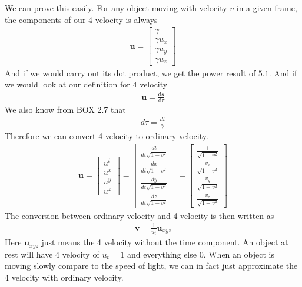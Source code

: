 \documentclass[11pt,letterpaper]{book}
\newcommand{\dydx}[2]{\frac{\text{d} #1}{\text{d} #2}}
\begin{document}
We can prove this easily. For any object moving with velocity $v$ in a given frame, the components of our 4 velocity is always
\begin{align}
\mathbf{u}=\begin{bmatrix}
    \gamma\\ \gamma u_x \\ \gamma u_y \\\gamma u_z 
\end{bmatrix}
\end{align}
And if we would carry out its dot product, we get the power result of $5.1$. And if we would look at our definition for 4 velocity
\begin{align}
\mathbf{u} = \dydx{\mathbf{s}}{\tau}
\end{align}
We also know from BOX 2.7 that
\begin{align}
d\tau = \frac{dt}{\gamma}
\end{align}
Therefore we can convert 4 velocity to ordinary velocity.
\begin{align}
\mathbf{u}= 
\begin{bmatrix}
u^t \\
u^x \\
u^y \\
u^z
\end{bmatrix}
=
\begin{bmatrix}
\frac{dt}{dt\sqrt{1 - v^2}} \\
\frac{dx}{dt\sqrt{1 - v^2}} \\
\frac{dy}{dt\sqrt{1 - v^2}} \\
\frac{dz}{dt\sqrt{1 - v^2}}
\end{bmatrix}
=
\begin{bmatrix}
\frac{1}{\sqrt{1 - v^2}} \\
\frac{v_x}{\sqrt{1 - v^2}} \\
\frac{v_y}{\sqrt{1 - v^2}} \\
\frac{v_z}{\sqrt{1 - v^2}}
\end{bmatrix}
\end{align}
The conversion between ordinary velocity and 4 velocity is then written as
\begin{align}
\mathbf{v} = \frac{1}{u_t}\mathbf{u}_{xyz}
\end{align}
Here $\mathbf{u}_{xyz}$ just means the 4 velocity without the time component. An object at rest will have 4 velocity of $u_t = 1$ and everything else $0$. When an object is moving slowly compare to the speed of light, we can in fact just approximate the 4 velocity with ordinary velocity.
\end{document}
